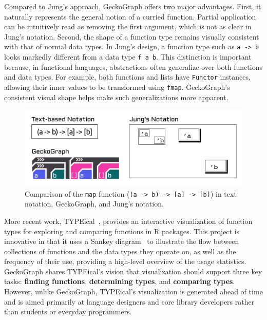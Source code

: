 \documentclass[preprint,12pt]{elsarticle}
\begin{document}
Compared to Jung’s approach, GeckoGraph offers two major advantages. 
First, it naturally represents the general notion of a curried function. Partial application can be intuitively read as removing the first argument, which is not as clear in Jung’s notation. 
Second, the shape of a function type remains visually consistent with that of normal data types. In Jung’s design, a function type such as \texttt{a -> b} looks markedly different from a data type \texttt{f a b}. 
This distinction is important because, in functional languages, abstractions often generalize over both functions and data types. 
For example, both functions and lists have \texttt{Functor} instances, allowing their inner values to be transformed using \texttt{fmap}. 
GeckoGraph’s consistent visual shape helps make such generalizations more apparent.

\begin{figure}
  \includegraphics[width=\linewidth]{figures/Jung}
  \caption{
        \label{fig:jung}
        Comparison of the \texttt{map} function (\texttt{(a -> b) -> [a] -> [b]}) in text notation, GeckoGraph, and Jung’s notation.
  }
\end{figure}

More recent work, TYPEical~\cite{Moy2020-tr}, provides an interactive visualization of function types for exploring and comparing functions in R packages. 
This project is innovative in that it uses a Sankey diagram~\cite{Keiderling2012-ag} to illustrate the flow between collections of functions and the data types they operate on, as well as the frequency of their use, providing a high-level overview of the usage statistics. 
GeckoGraph shares TYPEical’s vision that visualization should support three key tasks: \textbf{finding functions}, \textbf{determining types}, and \textbf{comparing types}. 
However, unlike GeckoGraph, TYPEical’s visualization is generated ahead of time and is aimed primarily at language designers and core library developers rather than students or everyday programmers.
\end{document}
